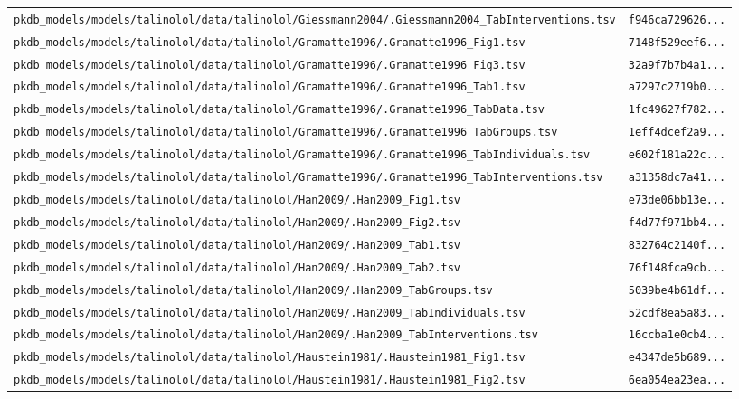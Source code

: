\begin{longtable}{ll}
\texttt{pkdb\_models/models/talinolol/data/talinolol/Giessmann2004/.Giessmann2004\_TabInterventions.tsv} & \texttt{f946ca729626...} \\
\texttt{pkdb\_models/models/talinolol/data/talinolol/Gramatte1996/.Gramatte1996\_Fig1.tsv} & \texttt{7148f529eef6...} \\
\texttt{pkdb\_models/models/talinolol/data/talinolol/Gramatte1996/.Gramatte1996\_Fig3.tsv} & \texttt{32a9f7b7b4a1...} \\
\texttt{pkdb\_models/models/talinolol/data/talinolol/Gramatte1996/.Gramatte1996\_Tab1.tsv} & \texttt{a7297c2719b0...} \\
\texttt{pkdb\_models/models/talinolol/data/talinolol/Gramatte1996/.Gramatte1996\_TabData.tsv} & \texttt{1fc49627f782...} \\
\texttt{pkdb\_models/models/talinolol/data/talinolol/Gramatte1996/.Gramatte1996\_TabGroups.tsv} & \texttt{1eff4dcef2a9...} \\
\texttt{pkdb\_models/models/talinolol/data/talinolol/Gramatte1996/.Gramatte1996\_TabIndividuals.tsv} & \texttt{e602f181a22c...} \\
\texttt{pkdb\_models/models/talinolol/data/talinolol/Gramatte1996/.Gramatte1996\_TabInterventions.tsv} & \texttt{a31358dc7a41...} \\
\texttt{pkdb\_models/models/talinolol/data/talinolol/Han2009/.Han2009\_Fig1.tsv} & \texttt{e73de06bb13e...} \\
\texttt{pkdb\_models/models/talinolol/data/talinolol/Han2009/.Han2009\_Fig2.tsv} & \texttt{f4d77f971bb4...} \\
\texttt{pkdb\_models/models/talinolol/data/talinolol/Han2009/.Han2009\_Tab1.tsv} & \texttt{832764c2140f...} \\
\texttt{pkdb\_models/models/talinolol/data/talinolol/Han2009/.Han2009\_Tab2.tsv} & \texttt{76f148fca9cb...} \\
\texttt{pkdb\_models/models/talinolol/data/talinolol/Han2009/.Han2009\_TabGroups.tsv} & \texttt{5039be4b61df...} \\
\texttt{pkdb\_models/models/talinolol/data/talinolol/Han2009/.Han2009\_TabIndividuals.tsv} & \texttt{52cdf8ea5a83...} \\
\texttt{pkdb\_models/models/talinolol/data/talinolol/Han2009/.Han2009\_TabInterventions.tsv} & \texttt{16ccba1e0cb4...} \\
\texttt{pkdb\_models/models/talinolol/data/talinolol/Haustein1981/.Haustein1981\_Fig1.tsv} & \texttt{e4347de5b689...} \\
\texttt{pkdb\_models/models/talinolol/data/talinolol/Haustein1981/.Haustein1981\_Fig2.tsv} & \texttt{6ea054ea23ea...} \\

\end{longtable}
